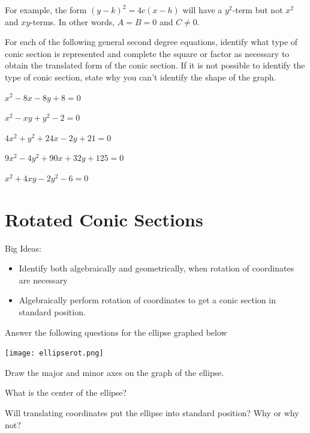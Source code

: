 For example, the form $(y-k)^2=4c(x-h)$ will have a $y^2$-term but not $x^2$ and $xy$-terms. In other words, $A=B=0$ and $C\neq 0$. \eq

\bq For each of the following general second degree equations, identify what type of conic section is represented and complete the square or factor as necessary to obtain the translated form of the conic section. If it is not possible to identify the type of conic section, state why you can't identify the shape of the graph.
\be
\item $x^2-8x-8y+8=0$
\item $x^2-xy+y^2-2=0$
\item $4x^2+y^2+24x-2y+21=0$
\item $9x^2-4y^2+90x+32y+125=0$
\item $x^2+4xy-2y^2-6=0$
\ee
\eq

\section{Rotated Conic Sections}
Big Ideas:
\begin{itemize}
\item Identify both algebraically and geometrically, when rotation of coordinates are necessary
\item Algebraically perform rotation of coordinates to get a conic section in standard position.
\end{itemize}
\bq
Answer the following questions for the ellipse graphed below
\begin{center} \texttt{[image: ellipserot.png]} \end{center}
\be
\item Draw the major and minor axes on the graph of the ellipse.
\item What is the center of the ellipse?
\item Will translating coordinates put the ellipse into standard position? Why or why not?
\ee
\eq

